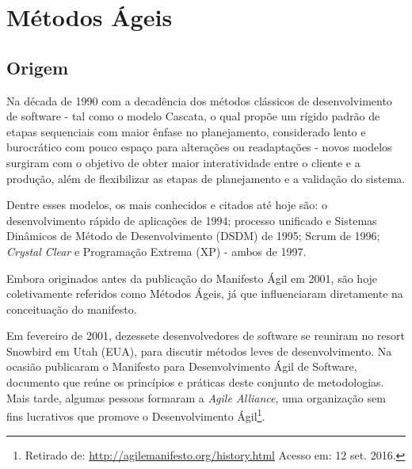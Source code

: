\chapter{Métodos Ágeis}
\label{cap:metodosageis}
\section{Origem}
\par  Na década de 1990 com a decadência dos métodos clássicos de desenvolvimento de software - tal como o modelo Cascata, o qual propõe um rígido padrão de etapas sequenciais com maior ênfase no planejamento, considerado lento e burocrático com pouco espaço para alterações ou readaptações - novos modelos surgiram com o objetivo de obter maior interatividade entre o cliente e a produção, além de flexibilizar as etapas de planejamento e a validação do sistema.
\par Dentre esses modelos, os mais conhecidos e citados até hoje são: o desenvolvimento rápido de aplicações de 1994; processo unificado e Sistemas Dinâmicos de Método de Desenvolvimento (DSDM) de 1995; Scrum de 1996; \emph{Crystal Clear} e Programação Extrema (XP) - ambos de 1997.
\par Embora originados antes da publicação do Manifesto Ágil em 2001, são hoje coletivamente referidos como Métodos Ágeis, já que influenciaram diretamente na conceituação do manifesto.
\par Em fevereiro de 2001, dezessete desenvolvedores de software se reuniram no resort Snowbird em Utah (EUA), para discutir métodos leves de desenvolvimento. Na ocasião publicaram o Manifesto para Desenvolvimento Ágil de Software, documento que reúne os princípios e práticas deste conjunto de metodologias. Mais tarde, algumas pessoas formaram a \emph{Agile Alliance}, uma organização sem fins lucrativos que promove o Desenvolvimento Ágil\footnote{Retirado de: \url{http://agilemanifesto.org/history.html} Acesso em: 12 set. 2016.}.
